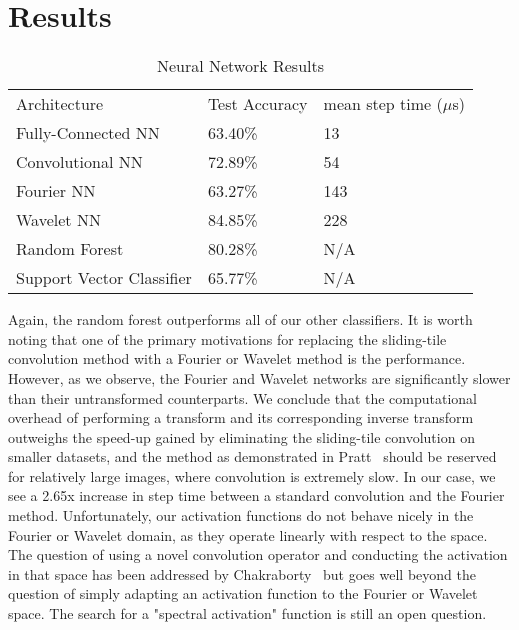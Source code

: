 \section{Results}
\begin{table}[ht]
\caption{Neural Network Results}
\centering
\label{Tab:test}	
\begin{tabular}{lll}
Architecture  & Test Accuracy & mean step time ($\mu$s) \\
Fully-Connected NN            & 63.40\%         & 13\\
Convolutional NN              & 72.89\%         & 54\\  
Fourier NN                    & 63.27\%         & 143\\
Wavelet NN                    & 84.85\%         & 228\\
Random Forest                 & 80.28\%         & N/A\\ 
Support Vector Classifier     & 65.77\%         & N/A       
\end{tabular}
\end{table}

Again, the random forest outperforms all of our other classifiers.
It is worth noting that one of the primary motivations for replacing the sliding-tile convolution method with a Fourier or Wavelet method is the performance.
However, as we observe, the Fourier and Wavelet networks are significantly slower than their untransformed counterparts.
We conclude that the computational overhead of performing a transform and its corresponding inverse transform outweighs the speed-up gained by eliminating the sliding-tile convolution on smaller datasets, and the method as demonstrated in Pratt~\cite{pratt2017fcnn} should be reserved for relatively large images, where convolution is extremely slow.
In our case, we see a 2.65x increase in step time between a standard convolution and the Fourier method. 
Unfortunately, our activation functions do not behave nicely in the Fourier or Wavelet domain, as they operate linearly with respect to the space. 
The question of using a novel convolution operator and conducting the activation in that space has been addressed by Chakraborty~\cite{chakraborty2019surreal} but goes well beyond the question of simply adapting an activation function to the Fourier or Wavelet space.
The search for a "spectral activation" function is still an open question.